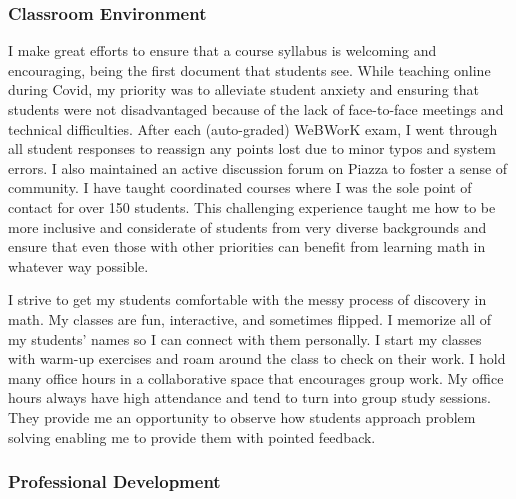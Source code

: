 \documentclass[
]{report}
\begin{document}
\hypertarget{classroom-environment}{%
\subsubsection*{Classroom Environment}\label{classroom-environment}}


I make great efforts to ensure that a course syllabus is welcoming and encouraging, being the first document that students see.
While teaching online during Covid, my priority was to alleviate student anxiety and ensuring that students were not disadvantaged because of the lack of face-to-face meetings and technical difficulties. After each (auto-graded) WeBWorK exam, I went through all student responses to reassign any points lost due to minor typos and system errors. I also maintained an active discussion forum on Piazza to foster a sense of community. I have taught coordinated courses where I was the sole point of contact for over 150 students. This challenging experience taught me how to be more inclusive and considerate of students from very diverse backgrounds and ensure that even those with other priorities can benefit from learning math in whatever way possible.

I strive to get my students comfortable with the messy process of discovery in math.
My classes are fun, interactive, and sometimes flipped.
I memorize all of my students' names so I can connect with them personally.
I start my classes with warm-up exercises and roam around the class to check on their work.
I hold many office hours in a collaborative space that encourages group work. My office hours always have high attendance and tend to turn into group study sessions.
They provide me an opportunity to observe how students approach problem solving enabling me to provide them with pointed feedback.

\hypertarget{professional-development}{%
\subsubsection*{Professional Development}\label{professional-development}}
\end{document}
